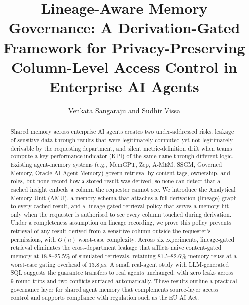 \documentclass[nolineno]{ieeeaccess}
\begin{document}
\title{Lineage-Aware Memory Governance: A Derivation-Gated Framework for
Privacy-Preserving Column-Level Access Control in Enterprise AI Agents}

\author{Venkata Sangaraju and Sudhir Vissa}

\address[1]{Independent Researcher (ORCID: 0009-0001-7716-1342)}
\address[2]{SAGE7 AI, Georgetown, Texas, USA (ORCID: 0009-0003-7865-0863)}



\begin{abstract}
Shared memory across enterprise AI agents creates two under-addressed
risks: leakage of sensitive data through results that were legitimately
computed yet not legitimately derivable by the requesting department, and
silent metric-definition drift when teams compute a key performance
indicator (KPI) of the same name through different logic. Existing
agent-memory systems (e.g., MemGPT, Zep, A-MEM, SSGM, Governed Memory,
Oracle AI Agent Memory) govern retrieval by content tags, ownership, and
roles, but none record how a stored result was derived, so none can detect
that a cached insight embeds a column the requester cannot see. We
introduce the Analytical Memory Unit (AMU), a memory schema that attaches a
full derivation (lineage) graph to every cached result, and a
lineage-gated retrieval policy that serves a memory hit only when the
requester is authorised to see every column touched during derivation.
Under a completeness assumption on lineage recording, we prove this policy
prevents retrieval of any result derived from a sensitive column outside
the requester's permissions, with $O(n)$ worst-case complexity. Across six
experiments, lineage-gated retrieval eliminates the cross-department
leakage that afflicts naive content-gated memory at $18.8$--$25.5\%$ of
simulated retrievals, retaining $81.5$--$82.6\%$ memory reuse at a
worst-case gating overhead of $13.8\,\mu$s. A small real-agent study with
LLM-generated SQL suggests the guarantee transfers to real agents
unchanged, with zero leaks across 9 round-trips and two conflicts surfaced
automatically. These results outline a practical governance layer for
shared agent memory that complements source-layer access control and
supports compliance with regulation such as the EU AI Act.
\end{abstract}
\end{document}
